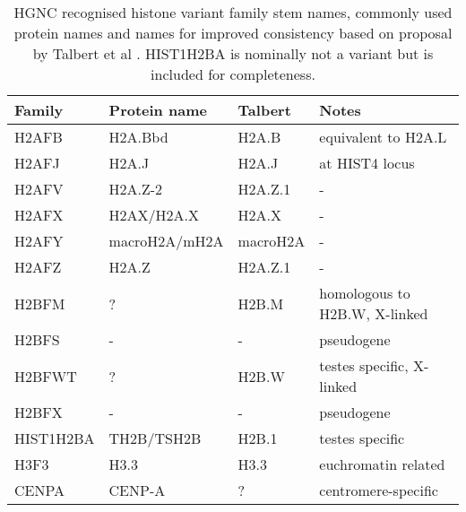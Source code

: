   \begin{table*}
    \caption{HGNC recognised histone variant family stem names, commonly used protein names 
	and names for improved consistency based on proposal by Talbert et al \citep{Talbert2012}. 
	HIST1H2BA is nominally not a variant but is included for completeness.}
    \label{tab:histone-variant-families}
    \centering
    \begin{tabular}{l l l l}
      \toprule
      Family & Protein name & Talbert & Notes \\
      \midrule
	  H2AFB & H2A.Bbd & H2A.B & equivalent to H2A.L \\
	  H2AFJ & H2A.J & H2A.J & at HIST4 locus \\
	  H2AFV & H2A.Z-2 & H2A.Z.1 & - \\
	  H2AFX & H2AX/H2A.X & H2A.X & - \\
	  H2AFY & macroH2A/mH2A & macroH2A & - \\
	  H2AFZ & H2A.Z & H2A.Z.1 & - \\
	  H2BFM & ? & H2B.M & homologous to H2B.W, X-linked\\
	  H2BFS & - & - & pseudogene \\
	  H2BFWT & ? & H2B.W & testes specific, X-linked \\
	  H2BFX & - & - & pseudogene \\
	  HIST1H2BA & TH2B/TSH2B & H2B.1 & testes specific \\
	  H3F3 & H3.3 & H3.3 & euchromatin related \\
	  CENPA & CENP-A & ? & centromere-specific \\
	\bottomrule
    \end{tabular}
  \end{table*}


    \begin{figure*}
      \centering
      \hfill
      \hfill
      \label{fig:histone-gene-variation}
    \end{figure*}

